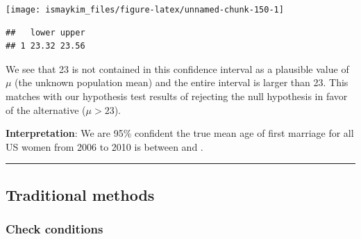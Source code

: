 \documentclass[]{tufte-book}
\newenvironment{Shaded}{\begin{snugshade}}{\end{snugshade}}
\newcommand{\KeywordTok}[1]{\textcolor[rgb]{0.13,0.29,0.53}{\textbf{{#1}}}}
\newcommand{\DataTypeTok}[1]{\textcolor[rgb]{0.13,0.29,0.53}{{#1}}}
\newcommand{\DecValTok}[1]{\textcolor[rgb]{0.00,0.00,0.81}{{#1}}}
\newcommand{\FloatTok}[1]{\textcolor[rgb]{0.00,0.00,0.81}{{#1}}}
\newcommand{\StringTok}[1]{\textcolor[rgb]{0.31,0.60,0.02}{{#1}}}
\newcommand{\NormalTok}[1]{{#1}}
\let\oldrule=\rule
\renewcommand{\rule}[1]{\oldrule{\linewidth}}
\theoremstyle{definition}
\theoremstyle{definition}
\theoremstyle{remark}
\begin{document}
\begin{Shaded}
\end{Shaded}

\begin{center}\texttt{[image: ismaykim\_files/figure-latex/unnamed-chunk-150-1]} \end{center}

\begin{Shaded}
\end{Shaded}

\begin{verbatim}
##   lower upper
## 1 23.32 23.56
\end{verbatim}

We see that 23 is not contained in this confidence interval as a
plausible value of \(\mu\) (the unknown population mean) and the entire
interval is larger than 23. This matches with our hypothesis test
results of rejecting the null hypothesis in favor of the alternative
(\(\mu > 23\)).

\textbf{Interpretation}: We are 95\% confident the true mean age of
first marriage for all US women from 2006 to 2010 is between and .

\begin{center}\rule{0.5\linewidth}{\linethickness}\end{center}

\subsection{Traditional methods}\label{traditional-methods}

\subsubsection{Check conditions}\label{check-conditions}
\end{document}
